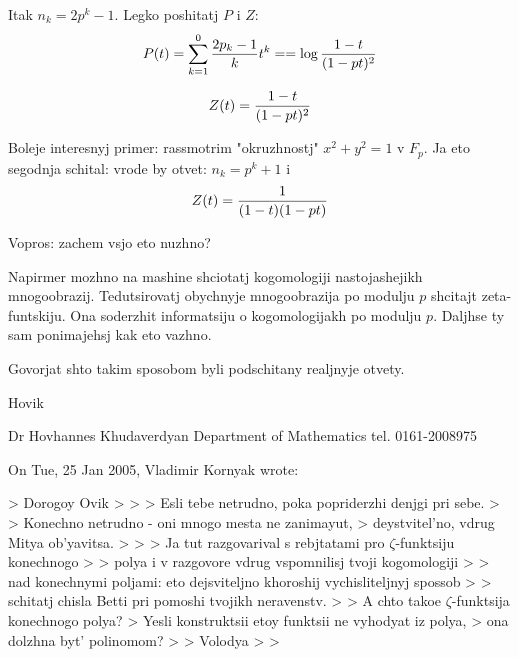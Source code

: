 Itak $n_k=2p^k-1$. Legko poshitatj $P$ i $Z$:
                    $$
                 P(t)=\sum_{k=1}^0 {2p_k-1\over k}t^k=
              =\log {1-t\over (1-pt)^2}
                      $$

                  $$
  Z(t)= {1-t\over (1-pt)^2}
                   $$

Boleje interesnyj primer: rassmotrim "okruzhnostj"
   $x^2+y^2=1$ v $F_p$. Ja eto segodnja schital:
vrode by otvet: $n_k=p^k+1$ i
        $$
        Z(t)={1\over (1-t)(1-pt)}
             $$

Vopros: zachem vsjo eto nuzhno?

 Napirmer mozhno na mashine shciotatj kogomologiji
nastojashejikh mnogoobrazij.  Tedutsirovatj
obychnyje mnogoobrazija po modulju $p$
shcitajt zeta-funtskiju. Ona soderzhit informatsiju
o kogomologijakh po modulju $p$. Daljhse ty sam ponimajehsj
kak eto vazhno.

Govorjat shto takim sposobom byli podschitany realjnyje otvety.



               Hovik

\bye

                        Dr Hovhannes Khudaverdyan
                                   Department of Mathematics
                                      tel. 0161-2008975


On Tue, 25 Jan 2005, Vladimir Kornyak wrote:

> Dorogoy Ovik
>
> >   Esli tebe netrudno, poka popriderzhi denjgi pri sebe.
>
> Konechno netrudno - oni mnogo mesta ne zanimayut,
> deystvitel'no, vdrug Mitya ob'yavitsa.
>
> > Ja tut razgovarival s rebjtatami pro $\zeta$-funktsiju konechnogo
> > polya i v razgovore vdrug vspomnilisj tvoji kogomologiji
> > nad konechnymi poljami: eto dejsviteljno khoroshij vychisliteljnyj spossob
> >  schitatj chisla Betti pri pomoshi tvojikh neravenstv.
>
> A chto takoe $\zeta$-funktsija konechnogo polya?
> Yesli konstruktsii etoy funktsii ne vyhodyat iz polya,
> ona dolzhna byt' polinomom?
>
> Volodya
>
>
